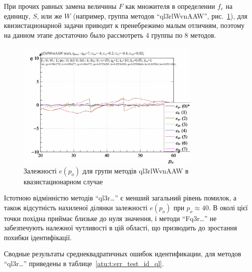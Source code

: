 При прочих равных замена величины $F$ как множителя в определении $f_e$
на единицу, $S$, или же $W$
(например, группа методов ``ql3rlWvnAAW'', рис.~\ref{atu:f:ql3rlWvnAAW_scan}),
для квизистационарной задачи приводит к пренебрежимо малым отличиям,
поэтому на данном этапе достаточно было рассмотреть 4 группы по 8 методов.

\begin{figure}[htb!]
  \begin{center}
    \includegraphics[width=0.8\textwidth]{p/scan/qls-p_p_e_ql3rlWvnAAW_scan.png}
  \end{center}
  \caption{Залежності $e(p_o)$ для групи методів ql3rlWvnAAW в квазистационарном случае}
  \label{atu:f:ql3rlWvnAAW_scan}
\end{figure}

Істотною відмінністю методів ``ql3r\ldots'' є менший загальний рівень
помилок, а також відсутність нахиленої ділянки залежності $e (p_o)$ при
$p_o \approx 40$. В околі цієї точки похідна приймає близьке до нуля значення, і
методи ``Fq3r\ldots'' не забезпечують належної чутливості в цій області, що
призводить до зростання похибки ідентифікації.


Сводные результаты среднеквадратичных ошибок идентификации, для методов ``ql3r\ldots''
приведены в таблице~\ref{atu:t:err_test_id_ql}.

